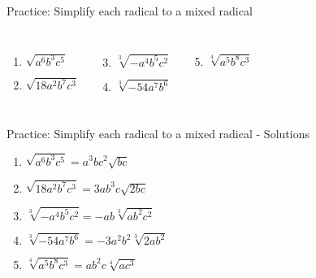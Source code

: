 \documentclass[aspectratio=169]{beamer}
\begin{document}
\begin{frame}{Practice: Simplify each radical to a mixed radical}
\begin{tcolorbox}[colback=lightgray,colframe=accent,title=Practice Problems]
\footnotesize
\begin{columns}[T]
\begin{enumerate}
  \item $\sqrt{a^6 b^3 c^5}$
  \item $\sqrt{18 a^2 b^7 c^3}$
\end{enumerate}
\begin{enumerate}
  \setcounter{enumi}{2}
  \item $\sqrt[3]{-a^4 b^5 c^2}$
  \item $\sqrt[3]{-54 a^7 b^6}$
\end{enumerate}
\begin{enumerate}
  \setcounter{enumi}{4}
  \item $\sqrt[4]{a^5 b^8 c^3}$
\end{enumerate}
\end{columns}
\end{tcolorbox}
\end{frame}

\begin{frame}{Practice: Simplify each radical to a mixed radical - Solutions}
\begin{tcolorbox}[colback=lightgray,colframe=primary,title=Solutions]
\footnotesize
\begin{enumerate}
  \item $\sqrt{a^6 b^3 c^5} = a^3 b c^2 \sqrt{b c}$
  \item $\sqrt{18 a^2 b^7 c^3} = 3 a b^3 c \sqrt{2 b c}$
  \item $\sqrt[3]{-a^4 b^5 c^2} = -a b \sqrt[3]{a b^2 c^2}$
  \item $\sqrt[3]{-54 a^7 b^6} = -3 a^2 b^2 \sqrt[3]{2 a b^2}$
  \item $\sqrt[4]{a^5 b^8 c^3} = a b^2 c \sqrt[4]{a c^3}$
\end{enumerate}
\end{tcolorbox}
\end{frame}
\end{document}
